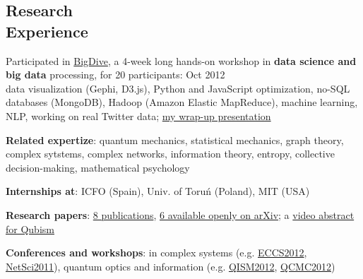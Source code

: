 \documentclass[margin,line]{resume}
\begin{document}
\begin{resume}

    \section{\mysidestyle Research\\Experience}

    \begin{list2}

    \item Participated in \href{http://bigdive.eu}{BigDive}, a 4-week long hands-on workshop in {\bf data science and big data} processing, for 20 participants: \hfill { Oct 2012}\\
        data visualization (Gephi, D3.js), Python and JavaScript optimization, no-SQL databases (MongoDB), Hadoop (Amazon Elastic MapReduce), machine learning, NLP, working on real Twitter data; \href{https://speakerdeck.com/pmigdal/a-map-of-256-tags-of-stackoverflow-at-bigdive-wrap-up}{my wrap-up presentation} 

    \item {\bf Related expertize}: quantum mechanics, statistical mechanics, graph theory, complex sytstems, complex networks, information theory, entropy, collective decision-making, mathematical psychology

    \item {\bf Internships at}: ICFO (Spain), Univ. of Toruń (Poland), MIT (USA)
    
    \item {\bf Research papers}: \href{http://scholar.google.com/citations?user=JUwBsPAAAAAJ&hl=en}{8 publications}, \href{http://arxiv.org/a/migdal\_p\_1}{6 available openly on arXiv};
    a \href{http://www.youtube.com/watch?v=8fPAzOziTZo}{video abstract for Qubism}

    \item {\bf Conferences and workshops}: in complex systems (e.g. \href{http://www.eccs2012.eu/}{ECCS2012}, \href{http://netsci2011.net/}{NetSci2011}), quantum optics and information (e.g. \href{http://www.uibk.ac.at/th-physik/qism2012/}{QISM2012}, \href{http://qcmc2012.org/}{QCMC2012})

    
    \end{list2}



\end{resume}
\end{document}

